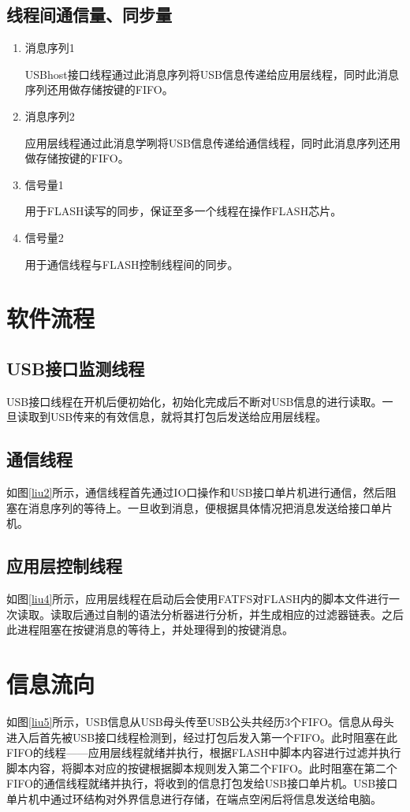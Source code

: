 \subsection{线程间通信量、同步量}
\begin{enumerate}
\item 消息序列1

USBhost接口线程通过此消息序列将USB信息传递给应用层线程，同时此消息序列还用做存储按键的FIFO。
\item 消息序列2

应用层线程通过此消息学咧将USB信息传递给通信线程，同时此消息序列还用做存储按键的FIFO。
\item 信号量1

用于FLASH读写的同步，保证至多一个线程在操作FLASH芯片。
\item 信号量2

用于通信线程与FLASH控制线程间的同步。
\end{enumerate}


\section{软件流程}
\subsection{USB接口监测线程}
USB接口线程在开机后便初始化，初始化完成后不断对USB信息的进行读取。一旦读取到USB传来的有效信息，就将其打包后发送给应用层线程。

\subsection{通信线程}
如图\ref{liu2}所示，通信线程首先通过IO口操作和USB接口单片机进行通信，然后阻塞在消息序列的等待上。一旦收到消息，便根据具体情况把消息发送给接口单片机。

\subsection{应用层控制线程}
如图\ref{liu4}所示，应用层线程在启动后会使用FATFS对FLASH内的脚本文件进行一次读取。读取后通过自制的语法分析器进行分析，并生成相应的过滤器链表。之后此进程阻塞在按键消息的等待上，并处理得到的按键消息。

\section{信息流向}
如图\ref{liu5}所示，USB信息从USB母头传至USB公头共经历3个FIFO。信息从母头进入后首先被USB接口线程检测到，经过打包后发入第一个FIFO。此时阻塞在此FIFO的线程——应用层线程就绪并执行，根据FLASH中脚本内容进行过滤并执行脚本内容，将脚本对应的按键根据脚本规则发入第二个FIFO。此时阻塞在第二个FIFO的通信线程就绪并执行，将收到的信息打包发给USB接口单片机。USB接口单片机中通过环结构对外界信息进行存储，在端点空闲后将信息发送给电脑。

